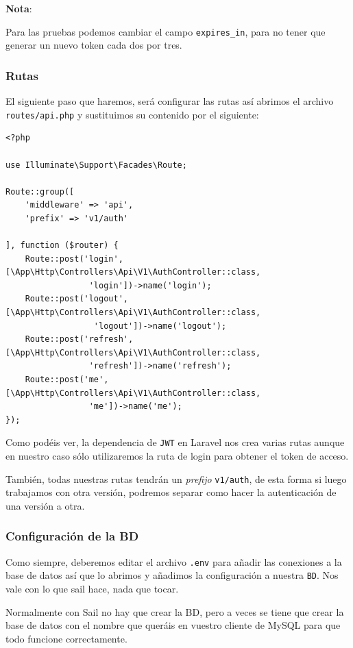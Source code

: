 \documentclass[11pt]{article}
\begin{document}
\textbf{Nota}:
\begin{mdframed}
Para las pruebas podemos cambiar el campo \texttt{expires\_in}, para no tener
que generar un nuevo token cada dos por tres.
\end{mdframed}

\subsubsection{Rutas}
\label{sec:org8c952e2}
El siguiente paso que haremos, será configurar las rutas así abrimos
el archivo \texttt{routes/api.php} y sustituimos su contenido por el siguiente:
\begin{verbatim}
<?php

use Illuminate\Support\Facades\Route;

Route::group([
    'middleware' => 'api',
    'prefix' => 'v1/auth'

], function ($router) {
    Route::post('login', [\App\Http\Controllers\Api\V1\AuthController::class,
                 'login'])->name('login');
    Route::post('logout', [\App\Http\Controllers\Api\V1\AuthController::class,
                  'logout'])->name('logout');
    Route::post('refresh', [\App\Http\Controllers\Api\V1\AuthController::class,
                 'refresh'])->name('refresh');
    Route::post('me', [\App\Http\Controllers\Api\V1\AuthController::class,
                 'me'])->name('me');
});
\end{verbatim}


Como podéis ver, la dependencia de \texttt{JWT} en Laravel nos crea varias
rutas aunque en nuestro caso sólo utilizaremos la ruta de login para
obtener el token de acceso.

También, todas nuestras rutas tendrán un \emph{prefijo} \texttt{v1/auth}, de esta
forma si luego trabajamos con otra versión, podremos separar como
hacer la autenticación de una versión a otra.

\subsubsection{Configuración de la BD}
\label{sec:orge21939f}
Como siempre, deberemos editar el archivo \texttt{.env} para añadir las
conexiones a la base de datos así que lo abrimos y añadimos la
configuración a nuestra \texttt{BD}. Nos vale con lo que sail hace, nada que
tocar.

Normalmente con Sail no hay que crear la BD, pero a veces se tiene que
crear la base de datos con el nombre que queráis en vuestro cliente de
MySQL para que todo funcione correctamente.
\end{document}
